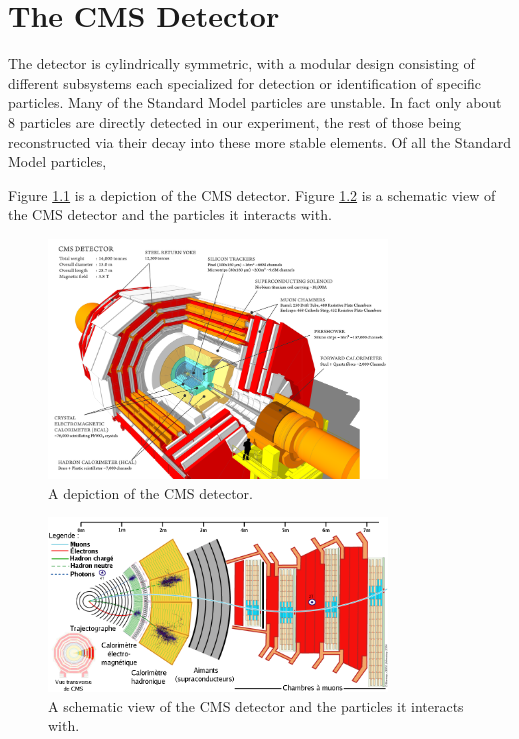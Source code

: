 \chapter{The CMS Detector}
\label{chap:detector}
The detector is cylindrically symmetric, with a modular design consisting of different subsystems each specialized for detection or identification of specific particles. Many of the Standard Model particles are unstable. In fact only about 8 particles are directly detected in our experiment, the rest of those being reconstructed via their decay into these more stable elements. Of all the Standard Model particles, 

Figure \ref{fig:howcmsworks} is a depiction of the CMS detector. Figure \ref{fig:schematicview} is a schematic view of the CMS detector and the particles it interacts with.

\begin{figure}[htbp]
\begin{centering}
\includegraphics[width=90mm]{figs/howcmsworks.png}
\caption{A depiction of the CMS detector.}
\label{fig:howcmsworks}
\end{centering}
\end{figure}

\begin{figure}[htbp]
\begin{centering}
\includegraphics[width=90mm]{figs/Schema_transverse_cms.png}
\caption{A schematic view of the CMS detector and the particles it interacts with.}
\label{fig:schematicview}
\end{centering}
\end{figure}

